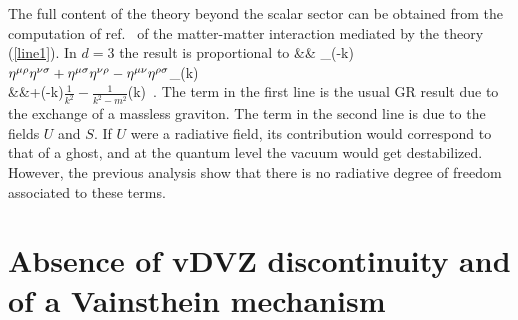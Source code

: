 \documentclass[aps,prd,twocolumn,superscriptaddress,nofootinbib]{revtex4}
\begin{document}
The full content of the theory beyond the scalar sector can be obtained from  the computation of ref.~\cite{Maggiore:2013mea}
of the matter-matter interaction mediated by the theory (\ref{line1}). In $d=3$ the result  is proportional to 
\bees
&& _{\mu\nu}(-k)\, 
\( \eMR\eNS +\eMS\eNR-\eMN\eRS \)_{\rho\sigma}(k) \nn\\
&&+(-k)\( \frac{1}{k^2}-\frac{1}{k^2-m^2}\)(k)\, .
\label{TDT}
\ees
The term in the first line is the usual GR result  due to the exchange of a massless graviton. The term in the second line is due to the fields $U$ and $S$. If $U$ were a radiative field, its contribution would correspond to that of a ghost, and at the quantum level the vacuum would get destabilized. However, the previous analysis show that there is no radiative degree of freedom associated to these terms.

\section{Absence of vDVZ discontinuity and of a Vainsthein mechanism}
\end{document}
